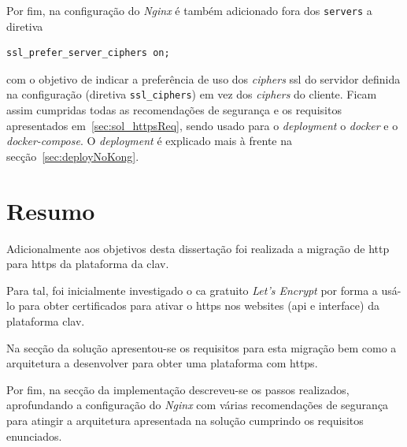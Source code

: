 Por fim, na configuração do \textit{Nginx} é também adicionado fora dos \texttt{servers} a diretiva 
\begin{lstlisting}
ssl_prefer_server_ciphers on;
\end{lstlisting}
com o objetivo de indicar a preferência de uso dos \textit{ciphers} \acrshort{ssl} do servidor definida na configuração (diretiva \texttt{ssl\_ciphers}) em vez dos \textit{ciphers} do cliente. Ficam assim cumpridas todas as recomendações de segurança e os requisitos apresentados em~\ref{sec:sol_httpsReq}, sendo usado para o \textit{deployment} o \textit{docker} e o \textit{docker-compose}. O \textit{deployment} é explicado mais à frente na secção~\ref{sec:deployNoKong}.

\section{Resumo}

Adicionalmente aos objetivos desta dissertação foi realizada a migração de \acrshort{http} para \acrshort{https} da plataforma da \acrshort{clav}.

Para tal, foi inicialmente investigado o \acrfull{ca} gratuito \textit{Let's Encrypt} por forma a usá-lo para obter certificados para ativar o \acrshort{https} nos websites (\acrshort{api} e interface) da plataforma \acrshort{clav}.

Na secção da solução apresentou-se os requisitos para esta migração bem como a arquitetura a desenvolver para obter uma plataforma com \acrshort{https}. 

Por fim, na secção da implementação descreveu-se os passos realizados, aprofundando a configuração do \textit{Nginx} com várias recomendações de segurança para atingir a arquitetura apresentada na solução cumprindo os requisitos enunciados.
